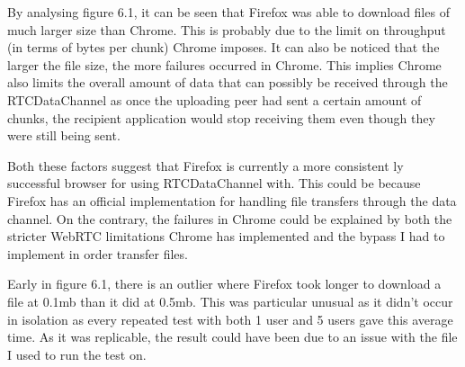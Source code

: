 \documentclass[]{report}
\begin{document}
		By analysing figure 6.1, it can be seen that Firefox was able to download files of much larger size than Chrome. This is probably due to the limit on throughput (in terms of bytes per chunk) Chrome imposes. It can also be noticed that the larger the file size, the more failures occurred in Chrome. This implies Chrome also limits the overall amount of data that can possibly be received through the RTCDataChannel as once the uploading peer had sent a certain amount of chunks, the recipient application would stop receiving them even though they were still being sent. 
		
		Both these factors suggest that Firefox is currently a more consistent ly successful browser for using RTCDataChannel with. This could be because Firefox has an official implementation for handling file transfers through the data channel. On the contrary, the failures in Chrome could be explained by both the stricter WebRTC limitations Chrome has implemented and the bypass I had to implement in order transfer files.
		
		Early in figure 6.1, there is an outlier where Firefox took longer to download a file at 0.1mb than it did at 0.5mb. This was particular unusual as it didn't occur in isolation as every repeated test with both 1 user and 5 users gave this average time. As it was replicable, the result could have been due to an issue with the file I used to run the test on.
\end{document}
